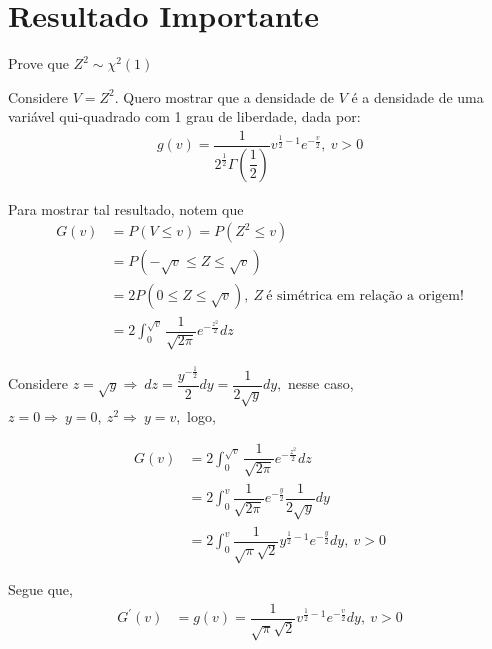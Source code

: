 \documentclass[12pt]{beamer}
\begin{document}
\section{Resultado Importante}
\begin{frame}{Prove que $Z^2\sim \chi^{2}(1)$}
\begin{block}{}
\justifying
Considere $V=Z^{2}.$ Quero mostrar que a densidade de $V$ é a densidade de uma variável qui-quadrado com 1 grau de liberdade, dada por:
\begin{align*}
    g(v)=\dfrac{1}{2^{\frac{1}{2}}\Gamma\left(\dfrac{1}{2}\right)}v^{\frac{1}{2}-1}e^{-\frac{v}{2}},~v>0
\end{align*}
\end{block}
\pause
\begin{block}{}
\justifying
Para mostrar tal resultado, notem que 
\begin{align*}
    G(v)&=P(V\leq v)=P(Z^{2}\leq v)\\
    &=P(-\sqrt{v}\leq Z\leq \sqrt{v})\\
    &=2P(0\leq Z\leq \sqrt{v}),~Z~\text{é simétrica em relação a origem!}\\
    &=2{\displaystyle\int_{0}^{\sqrt{v}}}\dfrac{1}{\sqrt{2\pi}}e^{-\frac{z^{2}}{2}}dz
\end{align*}
\end{block}
\end{frame}

\begin{frame}{}
\begin{block}{}
\justifying
Considere $z=\sqrt{y}\Rightarrow~dz=\dfrac{y^{-\frac{1}{2}}}{2}dy=\dfrac{1}{2\sqrt{y}}dy,$ nesse caso, $z=0\Rightarrow~y=0,~z^{2}\Rightarrow~y=v,$ logo, 
\end{block}
\pause
\begin{block}{}
\justifying
\begin{align*}
    G(v)&=2{\displaystyle\int_{0}^{\sqrt{v}}}\dfrac{1}{\sqrt{2\pi}}e^{-\frac{z^{2}}{2}}dz\\
    &=2{\displaystyle\int_{0}^{v}}\dfrac{1}{\sqrt{2\pi}}e^{-\frac{y}{2}}\dfrac{1}{2\sqrt{y}}dy\\
    &=2{\displaystyle\int_{0}^{v}}\dfrac{1}{\sqrt{\pi}\sqrt{2}}y^{\frac{1}{2}-1}e^{-\frac{y}{2}}dy,~v>0
\end{align*}
\end{block}
\pause 
\begin{block}{}
\justifying
Segue que,
\begin{align*}
    G^{'}(v)&=g(v)=\dfrac{1}{\sqrt{\pi}\sqrt{2}}v^{\frac{1}{2}-1}e^{-\frac{v}{2}}dy,~v>0
\end{align*}
\end{block}
\end{frame}
\end{document}
